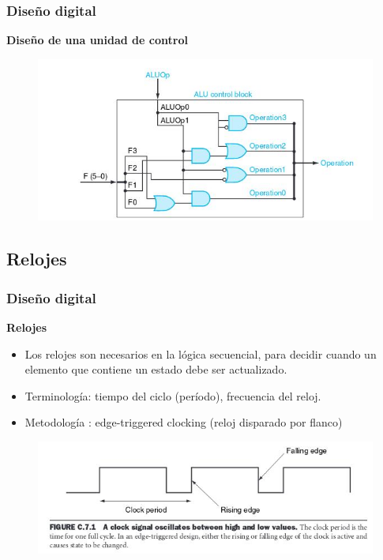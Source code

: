 \documentclass[aspectratio=169,compress]{beamer}
\begin{document}
\begin{footnotesize}
\begin{frame}[fragile]
\frametitle{Diseño digital}
\begin{center}\textbf{Diseño de una unidad de control}\end{center}
\begin{figure}
\includegraphics[scale=0.4]{images/control.jpg} 
\end{figure}
\end{frame}


\subsection{Relojes}

\begin{frame}[fragile]
\frametitle{Diseño digital}
\begin{center}\textbf{Relojes}\end{center}
\begin{itemize}
\item Los relojes son necesarios en la lógica secuencial, para decidir cuando un elemento que contiene un estado debe ser actualizado.
\item Terminología: tiempo del ciclo (período), frecuencia del reloj.
\item Metodología : edge-triggered clocking (reloj disparado por flanco)
\end{itemize}
\begin{figure}
\includegraphics[scale=0.4]{images/reloj.jpg} 
\end{figure}
\end{frame}



\end{footnotesize}
\end{document}

